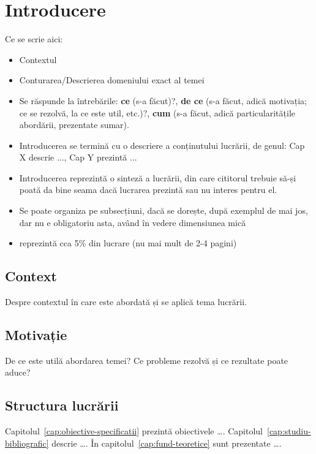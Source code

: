 
\chapter{Introducere}
\label{cap:Introducere}

Ce se scrie aici:
\begin{itemize}
    \item Contextul
    \item Conturarea/Descrierea domeniului exact al temei
    \item Se răspunde la întrebările: \textbf{ce} (s-a făcut)?, \textbf{de ce} (s-a făcut, adică motivația; ce se rezolvă, la ce este util, etc.)?, \textbf{cum} (s-a făcut, adică particularitățile abordării, prezentate sumar).
    \item Introducerea se termină cu o descriere a conținutului lucrării, de genul: Cap X descrie ..., Cap Y prezintă ...
    \item Introducerea reprezintă o sinteză a lucrării, din care cititorul trebuie să-și poată da bine seama dacă lucrarea prezintă sau nu interes pentru el. 
    \item Se poate organiza pe subsecțiuni, dacă se dorește, după exemplul de mai jos, dar nu e obligatoriu asta, având în vedere dimensiunea mică
    \item reprezintă cca 5\% din lucrare (nu mai mult de 2-4 pagini)
\end{itemize}

\section{Context}

Despre contextul în care este abordată și se aplică tema lucrării.

\section{Motivație}
De ce este utilă abordarea temei? Ce probleme rezolvă și ce rezultate poate aduce?

\section{Structura lucrării}
Capitolul~\ref{cap:obiective-specificatii} prezintă obiectivele \dots. Capitolul~\ref{cap:studiu-bibliografic} descrie \dots. În capitolul~\ref{cap:fund-teoretice} sunt prezentate \dots.

